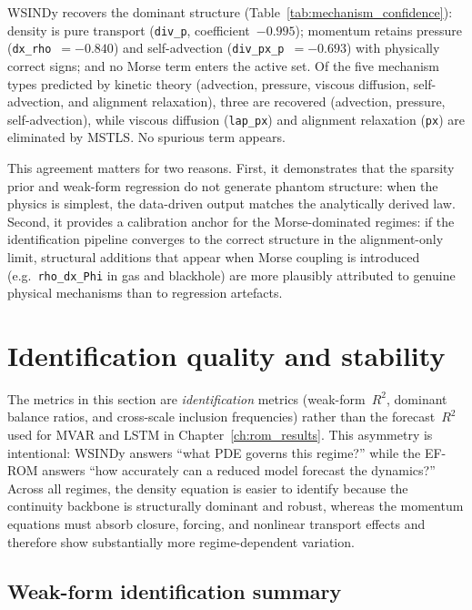 WSINDy recovers the dominant structure
(Table~\ref{tab:mechanism_confidence}): density is pure transport
(\texttt{div\_p}, coefficient~$-0.995$); momentum retains pressure
(\texttt{dx\_rho}~$=-0.840$) and self-advection
(\texttt{div\_px\_p}~$=-0.693$) with physically correct
signs; and no Morse term enters the active set.  Of the five
mechanism types predicted by kinetic theory (advection,
pressure, viscous diffusion, self-advection, and alignment
relaxation), three are recovered (advection, pressure,
self-advection), while viscous diffusion
(\texttt{lap\_px}) and alignment relaxation (\texttt{px})
are eliminated by MSTLS.  No spurious term appears.

This agreement matters for two reasons.  First, it demonstrates that the
sparsity prior and weak-form regression do not generate phantom structure:
when the physics is simplest, the data-driven output matches
the analytically derived law.  Second, it provides a calibration anchor
for the Morse-dominated regimes: if the identification pipeline converges
to the correct structure in the alignment-only limit, structural additions
that appear when Morse coupling is introduced (e.g.\
\texttt{rho\_dx\_Phi} in gas and blackhole) are more plausibly attributed
to genuine physical mechanisms than to regression artefacts.

\section{Identification quality and stability}
\label{sec:identification_quality}

The metrics in this section are \emph{identification}
metrics (weak-form~$R^2$, dominant balance ratios, and cross-scale inclusion
frequencies) rather than the forecast~$R^2$ used for MVAR and LSTM in
Chapter~\ref{ch:rom_results}.  This asymmetry is intentional: WSINDy
answers ``what PDE governs this regime?'' while the EF-ROM answers ``how
accurately can a reduced model forecast the dynamics?''
Across all regimes, the density equation is easier to identify because
the continuity backbone is structurally dominant and robust, whereas the
momentum equations must absorb closure, forcing, and nonlinear transport
effects and therefore show substantially more regime-dependent variation.

\subsection{Weak-form identification summary}

